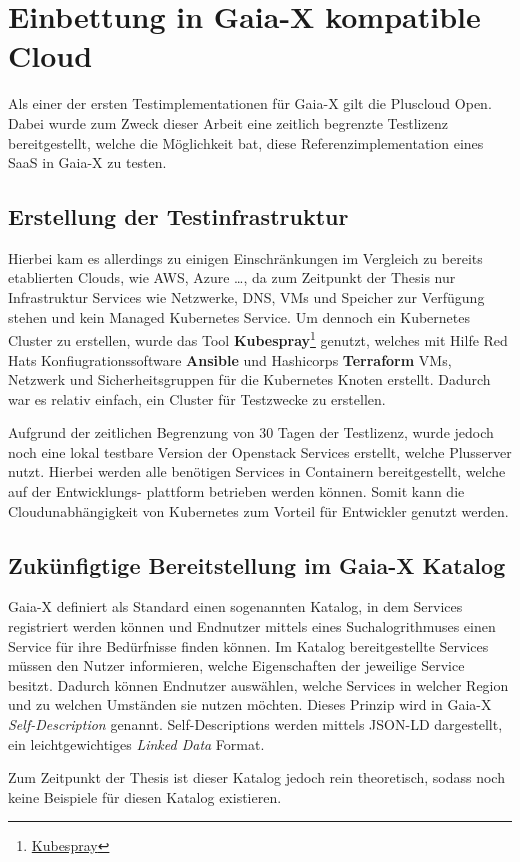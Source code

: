 \chapter{Einbettung in Gaia-X kompatible Cloud}
\label{chapter:gaia-x-einbettung}
Als einer der ersten Testimplementationen für Gaia-X gilt die Pluscloud Open.
Dabei wurde zum Zweck dieser Arbeit eine zeitlich begrenzte Testlizenz bereitgestellt, 
welche die Möglichkeit bat, diese Referenzimplementation eines \ac{SaaS} in Gaia-X zu testen.


\section{Erstellung der Testinfrastruktur}
\label{sec:erstellung-testinfra}
Hierbei kam es allerdings zu einigen Einschränkungen im Vergleich zu bereits etablierten Clouds, 
wie \ac{AWS}, Azure \dots, da zum Zeitpunkt der Thesis nur Infrastruktur Services wie Netzwerke, DNS, \acp{VM} und Speicher 
zur Verfügung stehen und kein Managed Kubernetes Service. Um dennoch ein Kubernetes Cluster zu erstellen,
wurde das Tool \textbf{Kubespray}\footnote{\href{https://github.com/kubernetes-sigs/kubespray}{Kubespray}} genutzt,
welches mit Hilfe Red Hats Konfiugrationssoftware \textbf{Ansible} und Hashicorps \textbf{Terraform} \acp{VM}, Netzwerk und Sicherheitsgruppen
für die Kubernetes Knoten erstellt. Dadurch war es relativ einfach, ein Cluster für Testzwecke zu erstellen.

Aufgrund der zeitlichen Begrenzung von 30 Tagen der Testlizenz, wurde jedoch noch eine lokal 
testbare Version der Openstack Services erstellt, welche Plusserver nutzt.
Hierbei werden alle benötigen Services in Containern bereitgestellt, welche auf der Entwicklungs-
plattform betrieben werden können. 
Somit kann die Cloudunabhängigkeit von Kubernetes zum Vorteil für Entwickler genutzt werden.


\section{Zukünfigtige Bereitstellung im Gaia-X Katalog}
\label{sec:erstellung-testinfra}
Gaia-X definiert als Standard einen sogenannten Katalog, in dem Services registriert werden können und Endnutzer
mittels eines Suchalogrithmuses einen Service für ihre Bedürfnisse finden können. 
Im Katalog bereitgestellte Services müssen den Nutzer informieren, welche Eigenschaften der jeweilige Service besitzt.
Dadurch können Endnutzer auswählen, welche Services in welcher Region und zu welchen Umständen sie nutzen möchten.
Dieses Prinzip wird in Gaia-X \emph{Self-Description} genannt. Self-Descriptions werden mittels JSON-LD dargestellt, ein
leichtgewichtiges \emph{Linked Data} Format. \cite{Eggers2020}

Zum Zeitpunkt der Thesis ist dieser Katalog jedoch rein theoretisch, sodass noch keine Beispiele für diesen Katalog existieren.
